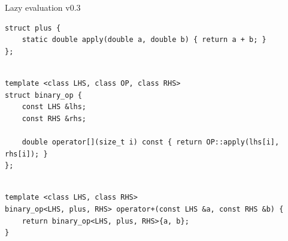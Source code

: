 \documentclass[@BEAMER_OPTIONS@]{beamer}
\begin{document}
\note{ }

\begin{frame}[fragile]{Lazy evaluation v0.3}
    \begin{exampleblock}{}
        \begin{lstlisting}
struct plus {
    static double apply(double a, double b) { return a + b; }
};
        \end{lstlisting}
        \pause
        \begin{lstlisting}[firstnumber=last]

template <class LHS, class OP, class RHS>
struct binary_op {
    const LHS &lhs;
    const RHS &rhs;

    double operator[](size_t i) const { return OP::apply(lhs[i], rhs[i]); }
};
        \end{lstlisting}
        \pause
        \begin{lstlisting}[firstnumber=last]

template <class LHS, class RHS>
binary_op<LHS, plus, RHS> operator+(const LHS &a, const RHS &b) {
    return binary_op<LHS, plus, RHS>{a, b};
}
        \end{lstlisting}
    \end{exampleblock}
\end{frame}

\note{ }
\end{document}
